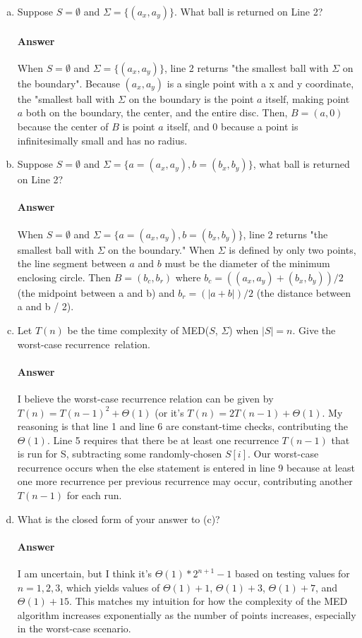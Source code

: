 \documentclass{article}
\begin{document}
\begin{enumerate}[(a)]
    \item
        Suppose $S=\emptyset$ and $\Sigma=\{ (a_x,a_y)\}$. What ball is returned on Line 2?
        \paragraph{Answer}
        When $S=\emptyset$ and $\Sigma=\{ (a_x,a_y)\}$, line 2 returns "the smallest ball with $\Sigma$ on the boundary". Because $(a_x, a_y)$ is a single point with a x and y coordinate, the "smallest ball with $\Sigma$ on the boundary is the point $a$ itself, making point $a$ both on the boundary, the center, and the entire disc. Then, $B = (a, 0)$ because the center of $B$ is point $a$ itself, and 0 because a point is infinitesimally small and has no radius. 
    \item
        Suppose $S=\emptyset$ and $\Sigma=\{ a=(a_x,a_y),b=(b_x,b_y)\}$, what ball is returned on Line 2?
        \paragraph{Answer}
        When $S=\emptyset$ and $\Sigma=\{ a=(a_x,a_y),b=(b_x,b_y)\}$, line 2 returns "the smallest ball with $\Sigma$ on the boundary." When $\Sigma$ is defined by only two points, the line segment between $a$ and $b$ must be the diameter of the minimum enclosing circle. Then $B = (b_c, b_r)$ where $b_c = ((a_x, a_y) + (b_x, b_y))/2$ (the midpoint between a and b) and $b_r = (|a + b|)/2$ (the distance between a and b / 2). 
    \item Let $T(n)$ be the time complexity of MED($S$, $\Sigma$) when
        $|S|=n$.  Give the worst-case recurrence~relation.
        \paragraph{Answer}
        I believe the worst-case recurrence relation can be given by $T(n) = T(n - 1)^2 + \Theta(1)$ (or it's $T(n) = 2T(n-1) + \Theta(1)$. My reasoning is that line 1 and line 6 are constant-time checks, contributing the $\Theta(1)$. Line 5 requires that there be at least one recurrence $T(n-1)$ that is run for S, subtracting some randomly-chosen $S[i]$. Our worst-case recurrence occurs when the else statement is entered in line 9 because at least one more recurrence per previous recurrence may occur, contributing another $T(n-1)$ for each run.
    \item What is the closed form of your answer to (c)?
        \paragraph{Answer}
	I am uncertain, but I think it's $\Theta(1) * 2^{n+1} - 1$ based on testing values for $n = 1, 2, 3$, which yields values of $\Theta(1) + 1$, $\Theta(1) + 3$, $\Theta(1) + 7$, and $\Theta(1) + 15$. This matches my intuition for how the complexity of the MED algorithm increases exponentially as the number of points increases, especially in the worst-case scenario.
\end{enumerate}
\end{document}
